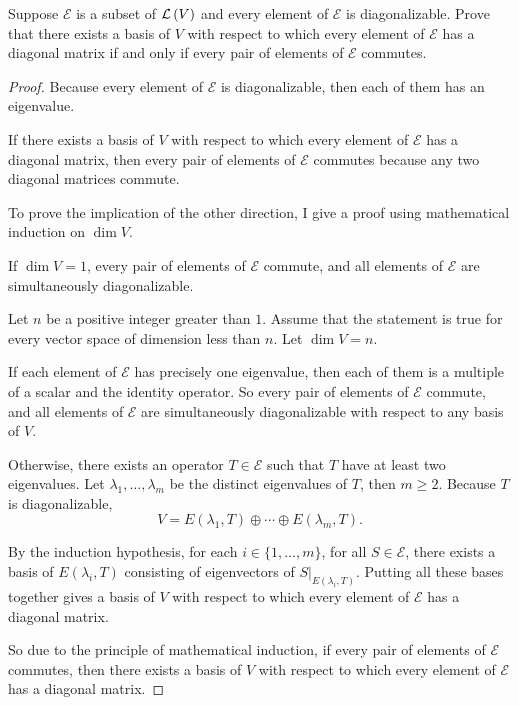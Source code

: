 \begin{exercise}
    Suppose $\mathcal{E}$ is a subset of $\mathcal{L}\left({V}\right)$ and every element of $\mathcal{E}$ is diagonalizable. Prove that there exists a basis of $V$ with respect to which every element of $\mathcal{E}$ has a diagonal matrix if and only if every pair of elements of $\mathcal{E}$ commutes.
\end{exercise}

\begin{proof}
    Because every element of $\mathcal{E}$ is diagonalizable, then each of them has an eigenvalue.

    If there exists a basis of $V$ with respect to which every element of $\mathcal{E}$ has a diagonal matrix, then every pair of elements of $\mathcal{E}$ commutes because any two diagonal matrices commute.

    To prove the implication of the other direction, I give a proof using mathematical induction on $\dim V$.

    If $\dim V = 1$, every pair of elements of $\mathcal{E}$ commute, and all elements of $\mathcal{E}$ are simultaneously diagonalizable.

    Let $n$ be a positive integer greater than $1$. Assume that the statement is true for every vector space of dimension less than $n$. Let $\dim V = n$.

    If each element of $\mathcal{E}$ has precisely one eigenvalue, then each of them is a multiple of a scalar and the identity operator. So every pair of elements of $\mathcal{E}$ commute, and all elements of $\mathcal{E}$ are simultaneously diagonalizable with respect to any basis of $V$.

    Otherwise, there exists an operator $T\in\mathcal{E}$ such that $T$ have at least two eigenvalues. Let $\lambda_{1}, \ldots, \lambda_{m}$ be the distinct eigenvalues of $T$, then $m\geq 2$. Because $T$ is diagonalizable,
    \[
        V = E(\lambda_{1}, T)\oplus \cdots \oplus E(\lambda_{m}, T).
    \]

    By the induction hypothesis, for each $i\in \{ 1, \ldots, m \}$, for all $S\in\mathcal{E}$, there exists a basis of $E(\lambda_{i}, T)$ consisting of eigenvectors of $S\vert_{E(\lambda_{i}, T)}$. Putting all these bases together gives a basis of $V$ with respect to which every element of $\mathcal{E}$ has a diagonal matrix.

    So due to the principle of mathematical induction, if every pair of elements of $\mathcal{E}$ commutes, then there exists a basis of $V$ with respect to which every element of $\mathcal{E}$ has a diagonal matrix.
\end{proof}
\newpage

